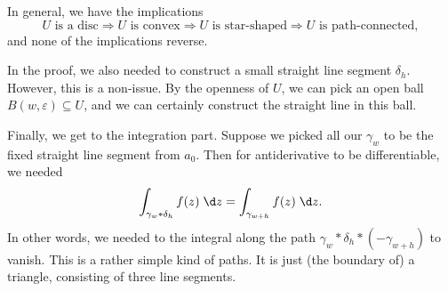 \documentclass[a4paper]{article}
\begin{document}
In general, we have the implications
\[
  U\text{ is a disc}\Rightarrow U\text{ is convex} \Rightarrow U\text{ is star-shaped} \Rightarrow U\text{ is path-connected},
\]
and none of the implications reverse.

In the proof, we also needed to construct a small straight line segment $\delta_h$. However, this is a non-issue. By the openness of $U$, we can pick an open ball $B(w, \varepsilon) \subseteq U$, and we can certainly construct the straight line in this ball.

Finally, we get to the integration part. Suppose we picked all our $\gamma_w$ to be the fixed straight line segment from $a_0$. Then for antiderivative to be differentiable, we needed
\[
  \int_{\gamma_w * \delta_h} f(z) \;\d z = \int_{\gamma_{w + h}} f(z)\;\d z.
\]
In other words, we needed to the integral along the path $\gamma_w * \delta_h * (-\gamma_{w + h})$ to vanish. This is a rather simple kind of paths. It is just (the boundary of) a triangle, consisting of three line segments.
\end{document}
